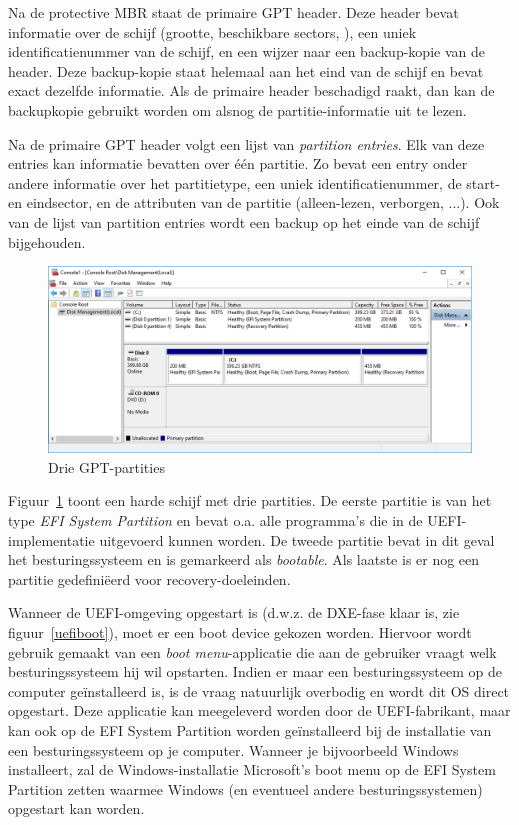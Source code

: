 Na de protective MBR staat de primaire GPT header. Deze header bevat informatie over de schijf (grootte, beschikbare sectors, ), een uniek identificatienummer van de schijf, en een wijzer naar een backup-kopie van de header. Deze backup-kopie staat helemaal aan het eind van de schijf en bevat exact dezelfde informatie. Als de primaire header beschadigd raakt, dan kan de backupkopie gebruikt worden om alsnog de partitie-informatie uit te lezen.

Na de primaire GPT header volgt een lijst van \emph{partition entries}. Elk van deze entries kan informatie bevatten over \'e\'en partitie. Zo bevat een entry onder andere informatie over het partitietype, een uniek identificatienummer, de start- en eindsector, en de attributen van de partitie (alleen-lezen, verborgen, ...). Ook van de lijst van partition entries wordt een backup op het einde van de schijf bijgehouden.

\begin{figure}
\begin{center}
\includegraphics[width=125mm]{images/diskmgr.png}
\end{center}
\caption{Drie GPT-partities}
\label{efisyspart}
\end{figure}

Figuur~\ref{efisyspart} toont een harde schijf met drie partities. De eerste partitie
is van het type \emph{EFI System Partition} en bevat o.a. alle programma's die in de
UEFI-implementatie uitgevoerd kunnen worden. De tweede partitie bevat in dit geval het
besturingssysteem en is gemarkeerd als \emph{bootable}. Als laatste is er nog een partitie
gedefini\"eerd voor recovery-doeleinden.

Wanneer de UEFI-omgeving opgestart is (d.w.z. de DXE-fase klaar is, zie figuur~\ref{uefiboot}), moet er een
boot device gekozen worden. Hiervoor wordt gebruik gemaakt van een \emph{boot menu}-applicatie
die aan de gebruiker vraagt welk besturingssysteem hij wil opstarten. Indien er maar
een besturingssysteem op de computer ge\"installeerd is, is de vraag natuurlijk overbodig
en wordt dit OS direct opgestart. Deze applicatie kan meegeleverd worden door de UEFI-fabrikant, maar kan
ook op de EFI System Partition worden ge\"installeerd bij de installatie van een besturingssysteem op je computer.
Wanneer je bijvoorbeeld Windows installeert, zal de Windows-installatie Microsoft's
boot menu op de EFI System Partition zetten waarmee Windows (en eventueel andere besturingssystemen)
opgestart kan worden.

